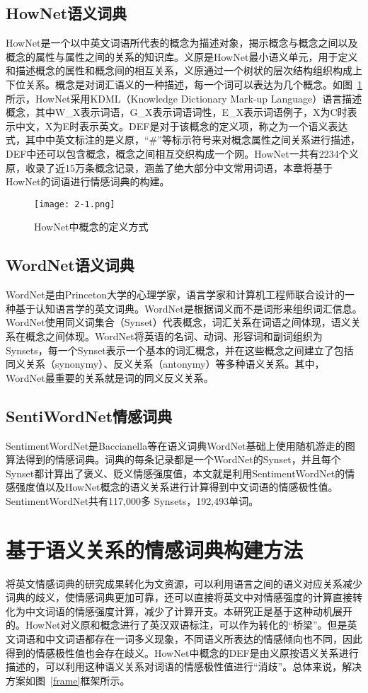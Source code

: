 \subsection{HowNet语义词典}
HowNet是一个以中英文词语所代表的概念为描述对象，揭示概念与概念之间以及概念的属性与属性之间的关系的知识库。义原是HowNet最小语义单元，用于定义和描述概念的属性和概念间的相互关系，义原通过一个树状的层次结构组织构成上下位关系。概念是对词汇语义的一种描述，每一个词可以表达为几个概念。如图~\ref{fig2-1}所示，HowNet采用KDML（Knowledge Dictionary Mark-up Language）语言描述概念，其中W\_X表示词语，G\_X表示词语词性，E\_X表示词语例子，X为C时表示中文，X为E时表示英文。DEF是对于该概念的定义项，称之为一个语义表达式，其中中英文标注的是义原，“\#\*”等标示符号来对概念属性之间关系进行描述，DEF中还可以包含概念，概念之间相互交织构成一个网。HowNet一共有2234个义原，收录了近15万条概念记录，涵盖了绝大部分中文常用词语，本章将基于HowNet的词语进行情感词典的构建。

\begin{figure}[htp]
\centering
\texttt{[image: 2-1.png]}
\caption{HowNet中概念的定义方式}
\label{fig2-1}
\end{figure}

\subsection{WordNet语义词典}
WordNet是由Princeton大学的心理学家，语言学家和计算机工程师联合设计的一种基于认知语言学的英文词典。WordNet是根据词义而不是词形来组织词汇信息。WordNet使用同义词集合（Synset）代表概念，词汇关系在词语之间体现，语义关系在概念之间体现。WordNet将英语的名词、动词、形容词和副词组织为Synsets，每一个Synset表示一个基本的词汇概念，并在这些概念之间建立了包括同义关系（synonymy）、反义关系（antonymy）等多种语义关系。其中，WordNet最重要的关系就是词的同义反义关系。

\subsection{SentiWordNet情感词典}
SentimentWordNet是Baccianella等在语义词典WordNet基础上使用随机游走的图算法得到的情感词典。词典的每条记录都是一个WordNet的Synset，并且每个Synset都计算出了褒义、贬义情感强度值，本文就是利用SentimentWordNet的情感强度值以及HowNet概念的语义关系进行计算得到中文词语的情感极性值。SentimentWordNet共有117,000多 Synsets，192,493单词。

\section{基于语义关系的情感词典构建方法}
\label{ch2:construct}
将英文情感词典的研究成果转化为文资源，可以利用语言之间的语义对应关系减少词典的歧义，使情感词典更加可靠，还可以直接将英文中对情感强度的计算直接转化为中文词语的情感强度计算，减少了计算开支。本研究正是基于这种动机展开的。HowNet对义原和概念进行了英汉双语标注，可以作为转化的“桥梁”。但是英文词语和中文词语都存在一词多义现象，不同语义所表达的情感倾向也不同，因此得到的情感极性值也会存在歧义。HowNet中概念的DEF是由义原按语义关系进行描述的，可以利用这种语义关系对词语的情感极性值进行“消歧”。总体来说，解决方案如图~\ref{frame}框架所示。

